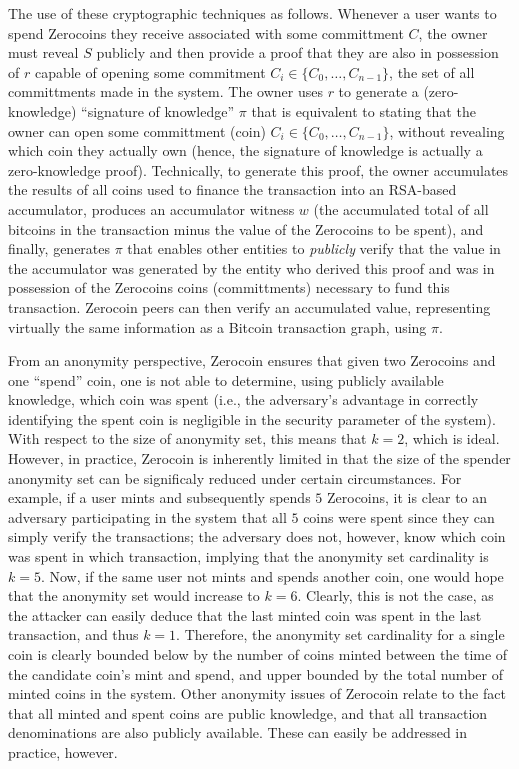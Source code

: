 The use of these cryptographic techniques as follows. Whenever a user wants to spend Zerocoins they receive associated with some committment $C$, the owner must reveal $S$ publicly and then provide a proof that they are also in possession of $r$ capable of opening some commitment $C_i \in \{C_0,\dots,C_{n-1}\}$, the set of all committments made in the system. The owner uses $r$ to generate a (zero-knowledge) ``signature of knowledge'' $\pi$ that is equivalent to stating that the owner can open some committment (coin) $C_i \in \{C_0,\dots,C_{n-1}\}$, without revealing which coin they actually own (hence, the signature of knowledge is actually a zero-knowledge proof). Technically, to generate this proof, the owner accumulates the results of all coins used to finance the transaction into an RSA-based accumulator, produces an accumulator witness $w$ (the accumulated total of all bitcoins in the transaction minus the value of the Zerocoins to be spent), and finally, generates $\pi$ that enables other entities to \emph{publicly} verify that the value in the accumulator was generated by the entity who derived this proof and was in possession of the Zerocoins coins (committments) necessary to fund this transaction. Zerocoin peers can then verify an accumulated value, representing virtually the same information as a Bitcoin transaction graph, using $\pi$.

From an anonymity perspective, Zerocoin ensures that given two Zerocoins and one ``spend'' coin, one is not able to determine, using publicly available knowledge, which coin was spent (i.e., the adversary's advantage in correctly identifying the spent coin is negligible in the security parameter of the system). With respect to the size of anonymity set, this means that $k = 2$, which is ideal. However, in practice, Zerocoin is inherently limited in that the size of the spender anonymity set can be significaly reduced under certain circumstances. For example, if a user mints and subsequently spends $5$ Zerocoins, it is clear to an adversary participating in the system that all $5$ coins were spent since they can simply verify the transactions; the adversary does not, however, know which coin was spent in which transaction, implying that the anonymity set cardinality is $k = 5$. Now, if the same user not mints and spends another coin, one would hope that the anonymity set would increase to $k = 6$. Clearly, this is not the case, as the attacker can easily deduce that the last minted coin was spent in the last transaction, and thus $k = 1$. Therefore, the anonymity set cardinality for a single coin is clearly bounded below by the number of coins minted between the time of the candidate coin's mint and spend, and upper bounded by the total number of minted coins in the system. Other anonymity issues of Zerocoin relate to the fact that all minted and spent coins are public knowledge, and that all transaction denominations are also publicly available. These can easily be addressed in practice, however.

